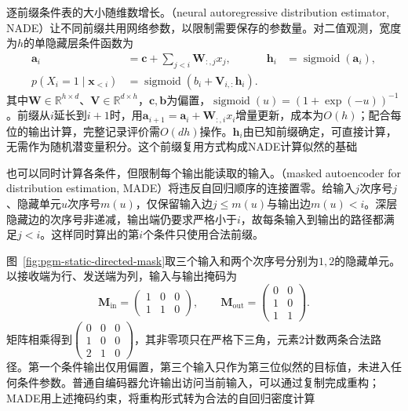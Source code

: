 逐前缀条件表的大小随维数增长。（neural autoregressive distribution estimator, NADE）让不同前缀共用网络参数，以限制需要保存的参数量。对二值观测，宽度为$h$的单隐藏层条件函数为
\begin{equation}
  \label{eq:pgm-static-directed-nade}
  \begin{aligned}
    \bm{a}_i&=\bm{c}+\sum_{j<i}\bm{W}_{:,j}x_j,&
    \bm{h}_i&=\operatorname{sigmoid}(\bm{a}_i),\\
    p(X_i=1\mid\bm{x}_{<i})
      &=\operatorname{sigmoid}
        (b_i+\bm{V}_{i,:}\bm{h}_i).
  \end{aligned}
\end{equation}
其中$\bm W\in\mathbb R^{h\times d}$、$\bm V\in\mathbb R^{d\times h}$，$\bm c,\bm b$为偏置，$\operatorname{sigmoid}(u)=(1+\exp(-u))^{-1}$。前缀从$i$延长到$i+1$时，用$\bm a_{i+1}=\bm a_i+\bm W_{:,i}x_i$增量更新，成本为$O(h)$；配合每位的输出计算，完整记录评价需$O(dh)$操作。$\bm h_i$由已知前缀确定，可直接计算，无需作为随机潜变量积分。这个前缀复用方式构成NADE计算似然的基础

也可以同时计算各条件，但限制每个输出能读取的输入。（masked autoencoder for distribution estimation, MADE）将违反自回归顺序的连接置零。给输入$j$次序号$j$、隐藏单元$u$次序号$m(u)$，仅保留输入边$j\le m(u)$与输出边$m(u)<i$。深层隐藏边的次序号非递减，输出端仍要求严格小于$i$，故每条输入到输出的路径都满足$j<i$。这样同时算出的第$i$个条件只使用合法前缀。

图~\ref{fig:pgm-static-directed-mask}取三个输入和两个次序号分别为$1,2$的隐藏单元。以接收端为行、发送端为列，输入与输出掩码为
\[
  \bm{M}_{\mathrm{in}}=
  \begin{pmatrix}1&0&0\\1&1&0\end{pmatrix},\qquad
  \bm{M}_{\mathrm{out}}=
  \begin{pmatrix}0&0\\1&0\\1&1\end{pmatrix}.
\]
矩阵相乘得到$\left(\begin{smallmatrix}0&0&0\\1&0&0\\2&1&0\end{smallmatrix}\right)$，其非零项只在严格下三角，元素$2$计数两条合法路径。第一个条件输出仅用偏置，第三个输入只作为第三位似然的目标值，未进入任何条件参数。普通自编码器允许输出访问当前输入，可以通过复制完成重构；MADE用上述掩码约束，将重构形式转为合法的自回归密度计算

